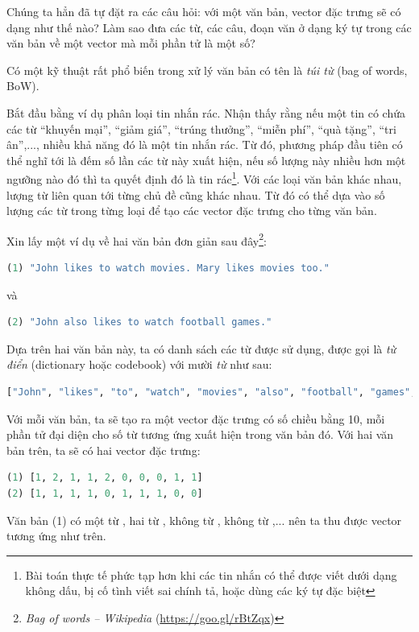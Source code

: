 Chúng ta hẳn đã tự đặt ra các câu hỏi: với một văn bản, vector đặc trưng sẽ có
dạng như thế nào? Làm sao đưa các từ, các câu, đoạn văn ở dạng ký tự
trong các văn bản về một vector mà mỗi phần tử là một số?

Có một kỹ thuật rất phổ biến trong xử lý văn bản có tên là \textit{túi từ}
({bag of words, BoW}).

Bắt đầu bằng ví dụ phân loại tin nhắn rác. Nhận thấy rằng nếu một tin có chứa
các từ {``khuyến mại'', ``giảm giá'', ``trúng thưởng'', ``miễn phí'', ``quà tặng'', ``tri
ân'',...}, nhiều khả năng đó là một tin nhắn rác. Từ đó, phương pháp đầu tiên có
thể nghĩ tới là {đếm} số lần các từ này xuất hiện, nếu số lượng này nhiều hơn
một ngưỡng nào đó thì ta quyết định đó là tin rác\footnote{Bài toán thực tế phức
tạp hơn khi các tin nhắn có thể được viết dưới dạng không dấu, bị cố tình viết
sai chính tả, hoặc dùng các ký tự đặc biệt}. Với các loại văn bản khác nhau,
lượng từ liên quan tới từng chủ đề cũng khác nhau. Từ đó có thể dựa vào số lượng
các từ trong từng loại để tạo các vector đặc trưng cho từng văn bản.

{}
Xin lấy một ví dụ về hai văn bản đơn giản sau đây\footnote{\textit{Bag of
words -- Wikipedia} (\url{https://goo.gl/rBtZqx})}:

\begin{lstlisting}[language=Python]
(1) "John likes to watch movies. Mary likes movies too."
\end{lstlisting}
và
\begin{lstlisting}[language=Python]
(2) "John also likes to watch football games."
\end{lstlisting}
Dựa trên hai văn bản này, ta có danh sách các từ được sử dụng, được gọi là
\textit{từ điển} ({dictionary} hoặc {codebook}) với mười
\textit{từ} như sau:

\begin{lstlisting}[language=Python]
["John", "likes", "to", "watch", "movies", "also", "football", "games", "Mary", "too"]
\end{lstlisting}
Với mỗi văn bản, ta sẽ tạo ra một vector đặc trưng có số chiều bằng 10, mỗi phần
tử đại diện cho số từ tương ứng xuất hiện trong văn bản đó. Với hai văn bản
trên, ta sẽ có hai vector đặc trưng:
\begin{lstlisting}[language=Python]
(1) [1, 2, 1, 1, 2, 0, 0, 0, 1, 1]
(2) [1, 1, 1, 1, 0, 1, 1, 1, 0, 0]
\end{lstlisting}
Văn bản (1) có một từ , hai từ , không từ
, không từ ,... nên ta thu được
vector tương ứng như trên.

